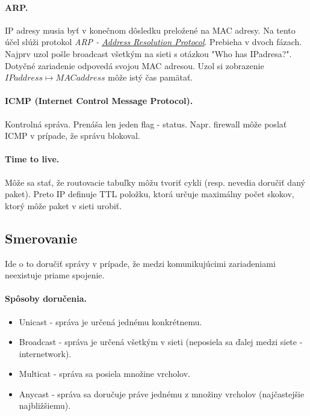 \documentclass[10pt,a4paper]{article}
\begin{document}
\paragraph{ARP.}
\label{ARP}
IP adresy musia byť v konečnom dôsledku preložené na MAC adresy. Na tento účel slúži protokol \emph{ARP - \href{http://en.wikipedia.org/wiki/Address\_Resolution\_Protocol}{Address Resolution Protocol}}. Prebieha v dvoch fázach. Najprv uzol pošle broadcast všetkým na sieti s otázkou "Who has IPadresa?". Dotyčné zariadenie odpovedá svojou MAC adresou. Uzol si zobrazenie $IPaddress \mapsto MACaddress$ môže istý čas pamätať.  

\paragraph{ICMP (Internet Control Message Protocol).}
Kontrolná správa. Prenáša len jeden flag - status. Napr. firewall môže poslať ICMP v prípade, že správu blokoval. 

\paragraph{Time to live.}
Môže sa stať, že routovacie tabuľky môžu tvoriť cykli (resp. nevedia doručiť daný paket).
Preto IP definuje TTL položku, ktorá určuje maximálny počet skokov, ktorý môže paket v sieti urobiť. 
           
\subsection{Smerovanie}         
\label{routing}

Ide o to doručiť správy v prípade, že medzi komunikujúcimi zariadeniami neexistuje priame spojenie. 

\paragraph{Spôsoby doručenia.}
\begin{itemize}
\item Unicast - správa je určená jednému konkrétnemu.         
\item Broadcast - správa je určená všetkým v sieti (neposiela sa ďalej medzi siete - internetwork).
\item Multicat - správa sa posiela množine vrcholov. 
\item Anycast - správa sa doručuje práve jednému z množiny vrcholov (najčastejšie najbližšiemu).
\end{itemize}                               
                
\end{document}
